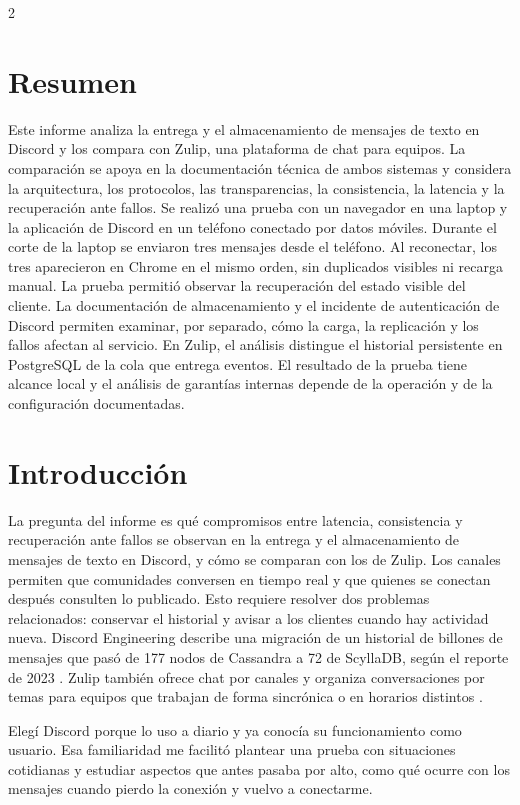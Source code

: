 \documentclass[11pt,a4paper]{article}
\begin{document}
\linespread{1.10}\selectfont
{}
\begin{multicols}{2}
\section*{Resumen}
Este informe analiza la entrega y el almacenamiento de mensajes de texto
en Discord y los compara con Zulip, una plataforma de chat para equipos.
La comparación se apoya en la documentación técnica de ambos sistemas y
considera la arquitectura, los protocolos, las transparencias, la
consistencia, la latencia y la recuperación ante fallos. Se realizó una
prueba con un navegador en una laptop y la aplicación de Discord en un
teléfono conectado por datos móviles. Durante el corte de la laptop se
enviaron tres mensajes desde el teléfono. Al reconectar, los tres
aparecieron en Chrome en el mismo orden, sin duplicados visibles ni
recarga manual. La prueba permitió observar la recuperación del estado
visible del cliente. La documentación de almacenamiento y el incidente
de autenticación de Discord permiten examinar, por separado, cómo la
carga, la replicación y los fallos afectan al servicio. En Zulip, el
análisis distingue el historial persistente en PostgreSQL de la cola
que entrega eventos. El resultado de la prueba tiene alcance local y
el análisis de garantías internas depende de la operación y de la
configuración documentadas.

\section{Introducción}
La pregunta del informe es qué compromisos entre latencia, consistencia y
recuperación ante fallos se observan en la entrega y el almacenamiento de
mensajes de texto en Discord, y cómo se comparan con los de Zulip.
Los canales permiten que comunidades conversen en tiempo real y que
quienes se conectan después consulten lo publicado. Esto requiere
resolver dos problemas relacionados: conservar el historial y avisar a
los clientes cuando hay actividad nueva. Discord Engineering describe
una migración de un historial de billones de mensajes que pasó de 177
nodos de Cassandra a 72 de ScyllaDB, según el reporte de 2023
\cite{ingram2023messages}. Zulip también ofrece chat por canales y
organiza conversaciones por temas para equipos que trabajan de forma
sincrónica o en horarios distintos \cite{abbott2026zulip}.

Elegí Discord porque lo uso a diario y ya conocía su funcionamiento
como usuario. Esa familiaridad me facilitó plantear una prueba con
situaciones cotidianas y estudiar aspectos que antes pasaba por alto,
como qué ocurre con los mensajes cuando pierdo la conexión y vuelvo a
conectarme.


\end{multicols}
\end{document}
